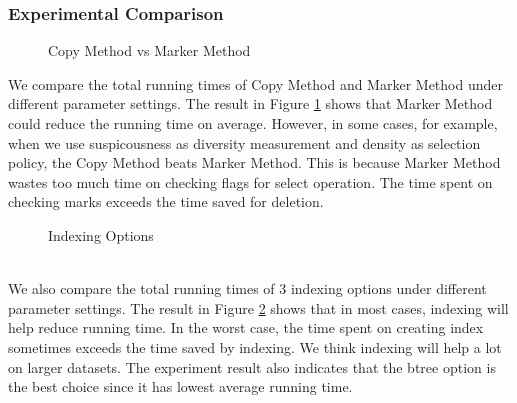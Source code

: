 \subsubsection{Experimental Comparison}
\begin{figure}[h]
    \begin{center}
    \end{center}
    \caption{Copy Method vs Marker Method}
    \label{fig:CopyMarker}
\end{figure}
We compare the total running times of Copy Method and Marker Method under different parameter settings. The result in Figure \ref{fig:CopyMarker} shows that Marker Method could reduce the running time on average. However, in some cases, for example, when we use suspicousness as diversity measurement and density as selection policy, the Copy Method beats Marker Method. This is because Marker Method wastes too much time on checking flags for select operation. The time spent on checking marks exceeds the time saved for deletion.
\begin{figure}[h]
    \begin{center}
    \end{center}
    \caption{Indexing Options}
    \label{fig:Indexing}
\end{figure} \\

We also compare the total running times of 3 indexing options under different parameter settings. The result in Figure \ref{fig:Indexing} shows that in most cases, indexing will help reduce running time. In the worst case, the time spent on creating index sometimes exceeds the time saved by indexing. We think indexing will help a lot on larger datasets. The experiment result also indicates that the btree option is the best choice since it has lowest average running time.\\